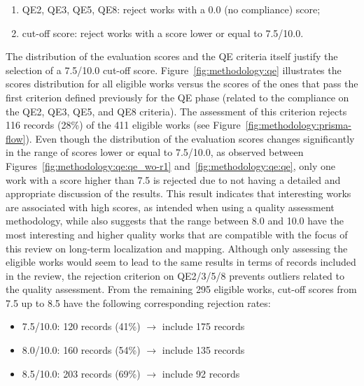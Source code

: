 \documentclass[10pt,a4paper,notitlepage,twocolumn,oneside]{article}
\begin{document}
\begin{enumerate}\setlength\itemsep{-0.5em}
\item QE2, QE3, QE5, QE8: reject works with a 0.0 (no compliance) score;
\item cut-off score: reject works with a score lower or equal to 7.5/10.0.
\end{enumerate}

The distribution of the evaluation scores and the QE criteria itself justify the selection of a 7.5/10.0 cut-off score. 
Figure~\ref{fig:methodology:qe} illustrates the scores distribution for all eligible works versus the scores of the ones that pass the first criterion defined previously for the QE phase (related to the compliance on the QE2, QE3, QE5, and QE8 criteria). The assessment of this criterion rejects 116 records (28\%) of the 411 eligible works (see Figure~\ref{fig:methodology:prisma-flow}). 
Even though the distribution of the evaluation scores changes significantly in the range of scores lower or equal to 7.5/10.0, as observed between Figures~\ref{fig:methodology:qe:qe_wo-r1} and~\ref{fig:methodology:qe:qe}, only one work with a score higher than 7.5 is rejected due to not having a detailed and appropriate discussion of the results. This result indicates that interesting works are associated with high scores, as intended when using a quality assessment methodology, while also suggests that the range between 8.0 and 10.0 have the most interesting and higher quality works that are compatible with the focus of this review on long-term localization and mapping. Although only assessing the eligible works would seem to lead to the same results in terms of records included in the review, the rejection criterion on QE2/3/5/8 prevents outliers related to the quality assessment.
From the remaining 295 eligible works, cut-off scores from 7.5 up to 8.5 have the following corresponding rejection rates:

\begin{itemize}\setlength\itemsep{-0.5em}
\item 7.5/10.0: 120 records (41\%) $\rightarrow$ include 175 records
\item 8.0/10.0: 160 records (54\%) $\rightarrow$ include 135 records
\item 8.5/10.0: 203 records (69\%) $\rightarrow$ include 92 records
\end{itemize}
\end{document}
